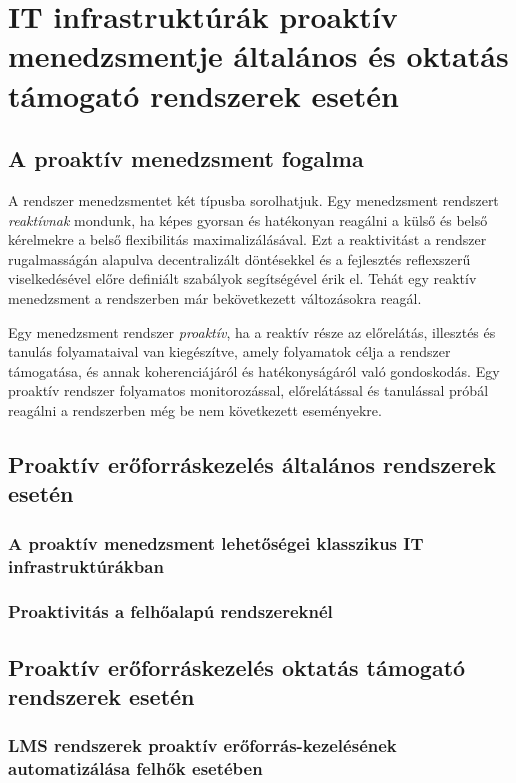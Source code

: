 \chapter{IT infrastruktúrák proaktív menedzsmentje általános és oktatás támogató rendszerek esetén}

\section{A proaktív menedzsment fogalma}

A rendszer menedzsmentet két típusba sorolhatjuk.  Egy menedzsment rendszert \textit{reaktívnak} mondunk, ha képes gyorsan és hatékonyan reagálni a külső és belső kérelmekre a belső flexibilitás maximalizálásával. Ezt a reaktivitást a rendszer rugalmasságán alapulva decentralizált döntésekkel és a fejlesztés reflexszerű viselkedésével előre definiált szabályok segítségével érik el.\cite{aftsarapms} Tehát egy reaktív menedzsment a rendszerben már bekövetkezett változásokra reagál.

Egy menedzsment rendszer \textit{proaktív}, ha a reaktív része az előrelátás, illesztés és tanulás folyamataival van kiegészítve, amely folyamatok célja a rendszer támogatása, és annak koherenciájáról és hatékonyságáról való gondoskodás. Egy proaktív rendszer folyamatos monitorozással, előrelátással és tanulással próbál reagálni a rendszerben még be nem következett eseményekre.

\section{Proaktív erőforráskezelés általános rendszerek esetén}

\subsection{A proaktív menedzsment lehetőségei klasszikus IT infrastruktúrákban}

\subsection{Proaktivitás a felhőalapú rendszereknél}

\section{Proaktív erőforráskezelés oktatás támogató rendszerek esetén}

\subsection{LMS rendszerek proaktív erőforrás-kezelésének automatizálása felhők esetében}

